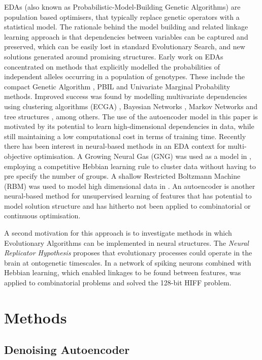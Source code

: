 \documentclass[runningheads,a4paper]{llncs}
\begin{document}
EDAs (also known as Probabilistic-Model-Building Genetic Algorithms) are population based optimisers, that typically replace genetic operators with a statistical model. The rationale behind the model building and related linkage learning approach is that dependencies between variables can be captured and preserved, which can be easily lost in standard Evolutionary Search, and new solutions generated around promising structures. Early work on EDAs concentrated on methods that explicitly modelled the probabilities of independent alleles occurring in a population of genotypes. These include the compact Genetic Algorithm \cite{cha}, PBIL \cite{phil} and Univariate Marginal Probability methods\cite{uvmp}. Improved success was found by modelling multivariate dependencies using clustering algorithms (ECGA) \cite{ecga}, Bayesian Networks \cite{hboa}, Markov Networks \cite{mccall} and tree structures \cite{ltga}, among others. The use of the autoencoder model in this paper is motivated by its potential to learn high-dimensional dependencies in data, while still maintaining a low computational cost in terms of training time. Recently there has been interest in neural-based methods in an EDA context for multi-objective optimisation. A Growing Neural Gas (GNG) was used as a model in \cite{moneda}, employing a competitive Hebbian learning rule to cluster data without having to pre specify the number of groups. A shallow Restricted Boltzmann Machine (RBM) was used to model high dimensional data in \cite{singapore}. An autoencoder is another neural-based method for unsupervised learning of features that has potential to model solution structure and has hitherto not been applied to combinatorial or continuous optimisation.

A second motivation for this approach is to investigate methods in which Evolutionary Algorithms can be implemented in neural structures. The {\em{Neural Replicator Hypothesis}} \cite{ref} proposes that evolutionary processes could operate in the brain at ontogenetic timescales. In \cite{fernando2010neuronal} a network of spiking neurons combined with Hebbian learning, which enabled linkages to be found between features, was applied to combinatorial problems and solved the 128-bit HIFF problem.

\section{Methods}

\subsection{Denoising Autoencoder}
\end{document}
